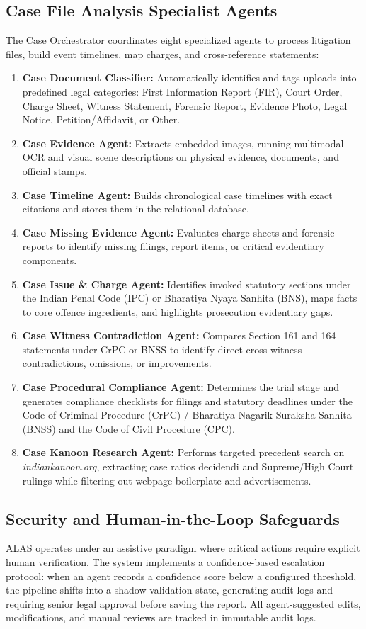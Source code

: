 \subsection{Case File Analysis Specialist Agents}
The Case Orchestrator coordinates eight specialized agents to process litigation files, build event timelines, map charges, and cross-reference statements:
\begin{enumerate}
\item \textbf{Case Document Classifier:} Automatically identifies and tags uploads into predefined legal categories: First Information Report (FIR), Court Order, Charge Sheet, Witness Statement, Forensic Report, Evidence Photo, Legal Notice, Petition/Affidavit, or Other.
\item \textbf{Case Evidence Agent:} Extracts embedded images, running multimodal OCR and visual scene descriptions on physical evidence, documents, and official stamps.
\item \textbf{Case Timeline Agent:} Builds chronological case timelines with exact citations and stores them in the relational database.
\item \textbf{Case Missing Evidence Agent:} Evaluates charge sheets and forensic reports to identify missing filings, report items, or critical evidentiary components.
\item \textbf{Case Issue \& Charge Agent:} Identifies invoked statutory sections under the Indian Penal Code (IPC) or Bharatiya Nyaya Sanhita (BNS), maps facts to core offence ingredients, and highlights prosecution evidentiary gaps.
\item \textbf{Case Witness Contradiction Agent:} Compares Section 161 and 164 statements under CrPC or BNSS to identify direct cross-witness contradictions, omissions, or improvements.
\item \textbf{Case Procedural Compliance Agent:} Determines the trial stage and generates compliance checklists for filings and statutory deadlines under the Code of Criminal Procedure (CrPC) / Bharatiya Nagarik Suraksha Sanhita (BNSS) and the Code of Civil Procedure (CPC).
\item \textbf{Case Kanoon Research Agent:} Performs targeted precedent search on \emph{indiankanoon.org}, extracting case ratios decidendi and Supreme/High Court rulings while filtering out webpage boilerplate and advertisements.
\end{enumerate}

\subsection{Security and Human-in-the-Loop Safeguards}
ALAS operates under an assistive paradigm where critical actions require explicit human verification. The system implements a confidence-based escalation protocol: when an agent records a confidence score below a configured threshold, the pipeline shifts into a shadow validation state, generating audit logs and requiring senior legal approval before saving the report. All agent-suggested edits, modifications, and manual reviews are tracked in immutable audit logs.


